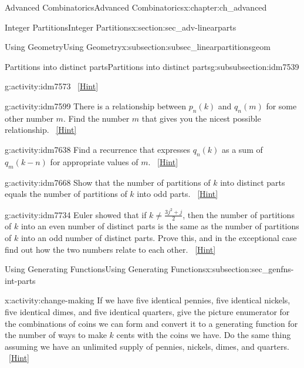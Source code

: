 \documentclass[oneside,10pt,]{book}
\numberwithin{equation}{chapter}
\begin{document}
\begin{chapterptx}{Advanced Combinatorics}{}{Advanced Combinatorics}{}{}{x:chapter:ch_advanced}
\begin{sectionptx}{Integer Partitions}{}{Integer Partitions}{}{}{x:section:sec_adv-linearparts}
\begin{subsectionptx}{Using Geometry}{}{Using Geometry}{}{}{x:subsection:subsec_linearpartitionsgeom}
\begin{subsubsectionptx}{Partitions into distinct parts}{}{Partitions into distinct parts}{}{}{g:subsubsection:idm7539}
\begin{activity}{}{g:activity:idm7573}
\qquad~\hfill{\tiny\hyperlink{g:hint:idm7576-back}{[Hint]}}\end{activity}
\begin{activity}{}{g:activity:idm7599}%
There is a relationship between \(p_n(k)\) and \(q_n(m)\) for some other number \(m\). Find the number \(m\) that gives you the nicest possible relationship.%
\qquad~\hfill{\tiny\hyperlink{g:hint:idm7606-back}{[Hint]}}\end{activity}
\begin{activity}{}{g:activity:idm7638}%
Find a recurrence that expresses \(q_n(k)\) as a sum of \(q_m(k-n)\) for appropriate values of \(m\).%
\qquad~\hfill{\tiny\hyperlink{g:hint:idm7644-back}{[Hint]}}\end{activity}
\begin{activity}{}{g:activity:idm7668}%
Show that the number of partitions of \(k\) into distinct parts equals the number of partitions of \(k\) into odd parts.%
\qquad~\hfill{\tiny\hyperlink{g:hint:idm7673-back}{[Hint]}}\end{activity}
\begin{activity}{}{g:activity:idm7734}%
Euler showed that if \(k\not= \frac{3j^2+j}{2}\), then the number of partitions of \(k\) into an even number of distinct parts is the same as the number of partitions of \(k\) into an odd number of distinct parts. Prove this, and in the exceptional case find out how the two numbers relate to each other.%
\qquad~\hfill{\tiny\hyperlink{g:hint:idm7740-back}{[Hint]}}\end{activity}
\end{subsubsectionptx}
\end{subsectionptx}
%
%
\typeout{************************************************}
\typeout{************************************************}
%
\begin{subsectionptx}{Using Generating Functions}{}{Using Generating Functions}{}{}{x:subsection:sec_genfns-int-parts}
\begin{activity}{}{x:activity:change-making}%
If we have five identical pennies, five identical nickels, five identical dimes, and five identical quarters, give the picture enumerator for the combinations of coins we can form and convert it to a generating function for the number of ways to make \(k\) cents with the coins we have. Do the same thing assuming we have an unlimited supply of pennies, nickels, dimes, and quarters.%
\qquad~\hfill{\tiny\hyperlink{g:hint:idm7798-back}{[Hint]}}\end{activity}

\end{subsectionptx}
\end{sectionptx}
\end{chapterptx}
\end{document}
